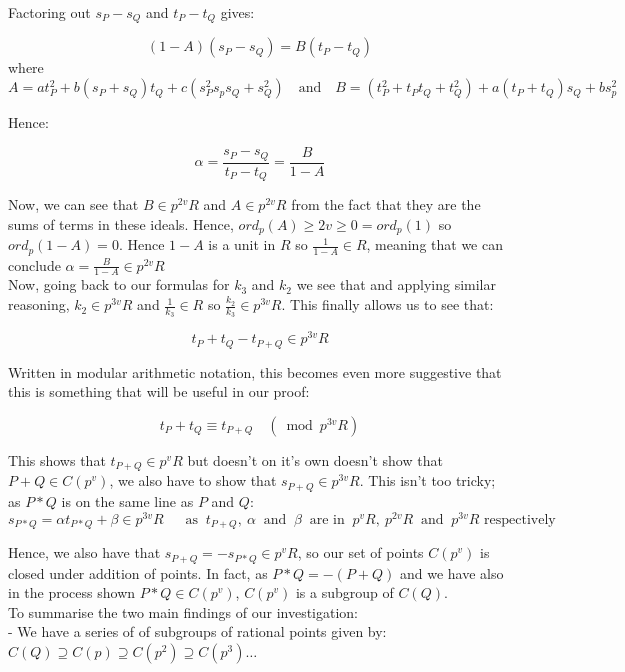 \documentclass{article}
\begin{document}
Factoring out $s_P - s_Q$ and $t_P - t_Q$ gives:

\[(1 - A)(s_P - s_Q) = B(t_P - t_Q)\]
where 
\[A = a t_P^2 + b(s_P + s_Q)t_Q + c(s_P ^2 s_p s_Q + s_Q^2) 
\quad \text{and} \quad
B = (t_P^2 + t_P t_Q + t_Q^2) + a (t_P + t_Q)s_Q + b s_p^2\]

Hence: 

\[ \alpha = \frac{s_P - s_Q}{t_P - t_Q} = \frac{B}{1 - A} \]

Now, we can see that $B \in p^{2v}R$ and $A \in p^{2v} R$ from the fact that they are the sums of terms in these ideals. Hence, $ord_p(A) \geq 2v \geq 0 = ord_p(1)$ so $ord_p(1 - A) = 0$. Hence $1 - A$ is a unit in $R$ so $\frac{1}{1 - A} \in R$, meaning that we can conclude $\alpha = \frac{B}{1 - A} \in p^{2v}R$ \\

Now, going back to our formulas for $k_3$ and $k_2$ we see that and applying similar reasoning, $k_2 \in p^{3v}R$ and $\frac{1}{k_3} \in R$ so $\frac{k_2}{k_3} \in p^{3v}R$. This finally allows us to see that:

\[ t_P + t_Q - t_{P+Q} \in p^{3v}R \]

Written in modular arithmetic notation, this becomes even more suggestive that this is something that will be useful in our proof: 

\[ t_P + t_Q  \equiv t_{P+Q} \quad (\bmod{p^{3v}R}) \]

This shows that $t_{P+Q} \in p^{v}R$ but doesn't on it's own doesn't show that $P + Q \in C(p^v)$, we also have to show that $s_{P + Q} \in p^{3v}R$. This isn't too tricky; as $P*Q$ is on the same line as $P$ and $Q$:\\

\[s_{P*Q} = \alpha t_{P*Q} + \beta \in p^{3v}R \quad \ \text{ as } \ t_{P+Q}, \ \alpha \ \text{ and } \ \beta \ \text{ are in } \ p^v R, \ p^{2v} R \ \text{ and } \ p^{3v} R  \text{ respectively} \]

Hence, we also have that $s_{P+Q} = -s_{P*Q} \in p^v R$, so our set of points $C(p^v)$ is closed under addition of points. In fact, as $P*Q = - (P+Q)$ and we have also in the process shown $P*Q \in C(p^v)$, $C(p^v)$ is a subgroup of $C(Q)$. \\

To summarise the two main findings of our investigation:\\

- We have a series of of subgroups of rational points given by: $C(Q) \supseteq C(p) \supseteq C(p^2) \supseteq C(p^3) \dots$\\
\end{document}
